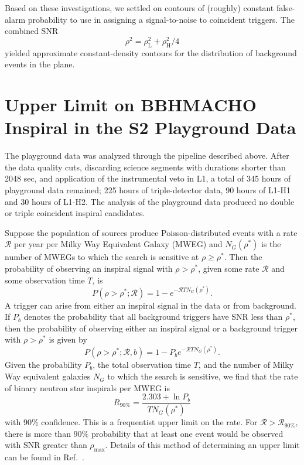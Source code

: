 Based on these investigations, we settled on contours of (roughly) constant
false-alarm probability to use in assigning a signal-to-noise to coincident
triggers. The combined SNR
\begin{equation}
\rho^2 = \rho^2_{\mathrm{L}} +  \rho_{\mathrm{H}}^2 / 4
\label{e:combined-snr}
\end{equation}
yielded approximate constant-density contours for the distribution of
background events in the plane.

\section{Upper Limit on BBHMACHO Inspiral in the S2 Playground Data}
\label{s:s2upperlimit}

The playground data was analyzed through the pipeline described above.  After
the data quality cuts,  discarding science segments with durations shorter
than 2048 sec,  and application of the instrumental veto in L1,  a total of
{345} hours of playground data remained; {225} hours of
triple-detector data,  {90} hours of L1-H1 and {30} hours of
L1-H2. The analysis of the playground data produced no double or triple
coincident inspiral candidates.

Suppose the population of sources produce Poisson-distributed events with
a rate $\mathcal{R}$ per year per Milky Way Equivalent Galaxy
(MWEG) and $N_G(\rho^\ast)$ is the
number of MWEGs to which the search is sensitive at $\rho \geq
\rho^\ast$.   Then the
probability of observing an inspiral signal with $\rho > \rho^\ast$,
given some rate $\mathcal{R}$ and some observation time $T$, is
\begin{equation}
  P(\rho>\rho^\ast;{\mathcal{R}}) = 1 - e^{-{\mathcal{R}}T N_G(\rho^\ast)}.
  \label{e:foreground-poisson}
\end{equation}
A trigger can arise from either an inspiral signal in the data or from
background.   If $P_b$ denotes the probability that all background triggers
have SNR less than $\rho^\ast$,  then the probability of observing
either an inspiral signal or a background trigger with $\rho > \rho^\ast$ 
is given by
\begin{equation}
  P(\rho>\rho^\ast;{\mathcal{R}},b) = 1 - P_b e^{-{\mathcal{R}}TN_G(\rho^\ast)}.
  \label{e:joint-dist}
\end{equation}
Given the
probability $P_b$, the total observation time $T$, and the number of Milky Way
equivalent galaxies $N_{{G}}$ to which the search is sensitive, we find that the 
rate of binary neutron star inspirals per MWEG is
\begin{equation}
  R_{90\%} = \frac{2.303+\ln P_b}{T N_{G}(\rho^\ast)}
\end{equation}
with 90\% confidence.  This is a frequentist upper limit on the rate.
For ${\mathcal{R}}>{\mathcal{R}}_{90\%}$, there is more than $90\%$
probability that at least one event would be observed with SNR greater
than $\rho_{\text{max}}$.   Details of this method of determining an 
upper limit can be found in Ref.~\cite{loudestGWDAW03}.


